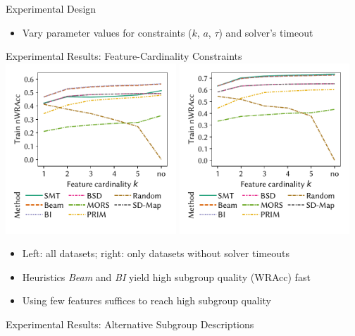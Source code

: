 \documentclass[USenglish]{article} %
\begin{document}
\begin{minipage}[t]{0.49\textwidth}
\begin{standardbox}{Experimental Design}
\begin{itemize}
			\item Vary parameter values for constraints ($k$, $a$, $\tau$) and solver's timeout
		\end{itemize}
	\end{standardbox}
	\vspace{10pt}
	\begin{standardbox}{Experimental Results: Feature-Cardinality Constraints}
		\centering
		\includegraphics[width=0.48\textwidth, trim=10 25 10 10, clip]{plots/csd-cardinality-train-nwracc-all-datasets.pdf}
		\hfill
		\includegraphics[width=0.48\textwidth, trim=10 25 10 10, clip]{plots/csd-cardinality-train-nwracc-no-timeout-datasets.pdf}
		\begin{itemize}
			\item Left: all datasets; right: only datasets without solver timeouts
			\item Heuristics \emph{Beam} and \emph{BI} yield high subgroup quality (WRAcc) fast
			\item Using few features suffices to reach high subgroup quality
		\end{itemize}
	\end{standardbox}
	\vspace{10pt}
	\begin{standardbox}{Experimental Results: Alternative Subgroup Descriptions}

\end{standardbox}
\end{minipage}
\end{document}
